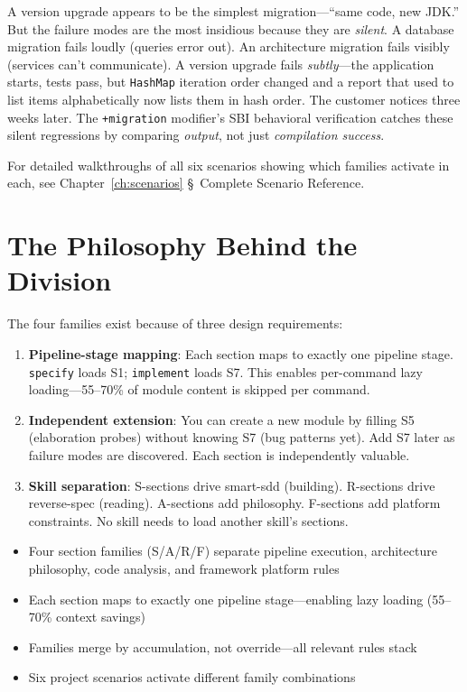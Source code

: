 \documentclass[11pt,a4paper,openright,twoside]{report}
\begin{document}
\begin{warnbox}
A version upgrade appears to be the simplest migration---``same code, new JDK.'' But the failure modes are the most insidious because they are \emph{silent}. A database migration fails loudly (queries error out). An architecture migration fails visibly (services can't communicate). A version upgrade fails \emph{subtly}---the application starts, tests pass, but \texttt{HashMap} iteration order changed and a report that used to list items alphabetically now lists them in hash order. The customer notices three weeks later. The \texttt{+migration} modifier's SBI behavioral verification catches these silent regressions by comparing \emph{output}, not just \emph{compilation success}.
\end{warnbox}

For detailed walkthroughs of all six scenarios showing which families activate in each, see Chapter~\ref{ch:scenarios} \S~Complete Scenario Reference.


\section{The Philosophy Behind the Division}

The four families exist because of three design requirements:

\begin{enumerate}
  \item \textbf{Pipeline-stage mapping}: Each section maps to exactly one pipeline stage. \texttt{specify} loads S1; \texttt{implement} loads S7. This enables per-command lazy loading---55--70\% of module content is skipped per command.
  \item \textbf{Independent extension}: You can create a new module by filling S5 (elaboration probes) without knowing S7 (bug patterns yet). Add S7 later as failure modes are discovered. Each section is independently valuable.
  \item \textbf{Skill separation}: S-sections drive smart-sdd (building). R-sections drive reverse-spec (reading). A-sections add philosophy. F-sections add platform constraints. No skill needs to load another skill's sections.
\end{enumerate}

\begin{tipbox}
\begin{itemize}[nosep]
  \item Four section families (S/A/R/F) separate pipeline execution, architecture philosophy, code analysis, and framework platform rules
  \item Each section maps to exactly one pipeline stage---enabling lazy loading (55--70\% context savings)
  \item Families merge by accumulation, not override---all relevant rules stack
  \item Six project scenarios activate different family combinations
\end{itemize}
\end{tipbox}
\end{document}
